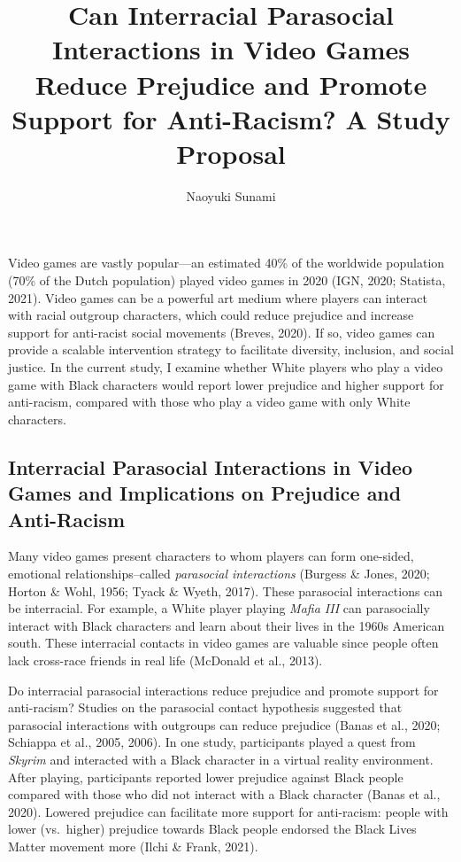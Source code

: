 \documentclass[
  english,
  man, noextraspace,floatsintext]{apa6}
\title{Can Interracial Parasocial Interactions in Video Games Reduce Prejudice and Promote Support for Anti-Racism? A Study Proposal}
\author{Naoyuki Sunami\textsuperscript{}}
\date{}
\affiliation{\phantom{0}}
\begin{document}
\maketitle

Video games are vastly popular---an estimated 40\% of the worldwide population (70\% of the Dutch population) played video games in 2020 (IGN, 2020; Statista, 2021). Video games can be a powerful art medium where players can interact with racial outgroup characters, which could reduce prejudice and increase support for anti-racist social movements (Breves, 2020). If so, video games can provide a scalable intervention strategy to facilitate diversity, inclusion, and social justice. In the current study, I examine whether White players who play a video game with Black characters would report lower prejudice and higher support for anti-racism, compared with those who play a video game with only White characters.

\hypertarget{interracial-parasocial-interactions-in-video-games-and-implications-on-prejudice-and-anti-racism}{%
\subsection{Interracial Parasocial Interactions in Video Games and Implications on Prejudice and Anti-Racism}\label{interracial-parasocial-interactions-in-video-games-and-implications-on-prejudice-and-anti-racism}}

Many video games present characters to whom players can form one-sided, emotional relationships--called \emph{parasocial interactions} (Burgess \& Jones, 2020; Horton \& Wohl, 1956; Tyack \& Wyeth, 2017). These parasocial interactions can be interracial. For example, a White player playing \emph{Mafia III} can parasocially interact with Black characters and learn about their lives in the 1960s American south. These interracial contacts in video games are valuable since people often lack cross-race friends in real life (McDonald et al., 2013).

Do interracial parasocial interactions reduce prejudice and promote support for anti-racism? Studies on the parasocial contact hypothesis suggested that parasocial interactions with outgroups can reduce prejudice (Banas et al., 2020; Schiappa et al., 2005, 2006). In one study, participants played a quest from \emph{Skyrim} and interacted with a Black character in a virtual reality environment. After playing, participants reported lower prejudice against Black people compared with those who did not interact with a Black character (Banas et al., 2020). Lowered prejudice can facilitate more support for anti-racism: people with lower (vs.~higher) prejudice towards Black people endorsed the Black Lives Matter movement more (Ilchi \& Frank, 2021).~
\end{document}
